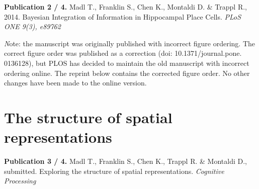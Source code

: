 \documentclass[12pt,PhD,twoside]{muthesis}
\begin{document}
\textbf{Publication 2 / 4.} Madl T., Franklin S., Chen K., Montaldi D. \& Trappl R., 2014. Bayesian Integration of Information in Hippocampal Place Cells. \textit{PLoS ONE 9(3), e89762}

\vspace{1cm}
 
\textit Note: the manuscript was originally published with incorrect figure ordering. The correct figure order was published as a correction (doi: 10.1371/journal.pone. 0136128), but PLOS has decided to maintain the old manuscript with incorrect ordering online. The reprint below contains the corrected figure order. No other changes have been made to the online version.

\newpage

\addtocounter{page}{-1}



\addtocounter{page}{-15}

\chapter{The structure of spatial representations}
\label{cha:structure}

\textbf{Publication 3 / 4.} Madl T., Franklin S., Chen K., Trappl R. \& Montaldi D., submitted. Exploring the structure of spatial representations. \textit{Cognitive Processing}

\newpage

\addtocounter{page}{-1}
\end{document}
